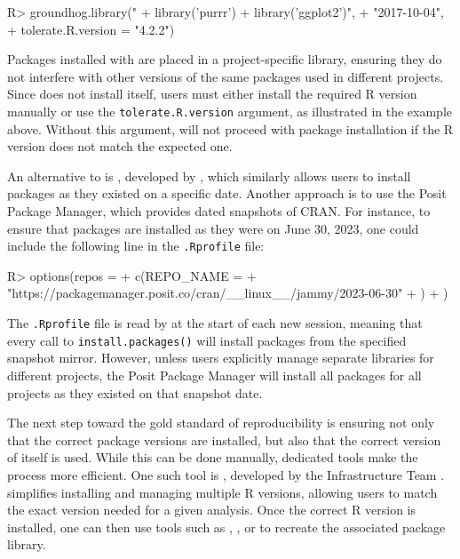 \documentclass[
  article]{jss}
\begin{document}
\begin{CodeInput}
R> groundhog.library("
+   library('purrr')
+   library('ggplot2')",
+   "2017-10-04",
+   tolerate.R.version = "4.2.2")
\end{CodeInput}

Packages installed with  are placed in a project-specific
library, ensuring they do not interfere with other versions of the same
packages used in different projects. Since  does not
install  itself, users must either install the required R
version manually or use the \texttt{tolerate.R.version} argument, as
illustrated in the example above. Without this argument, 
will not proceed with package installation if the R version does not
match the expected one.

An alternative to  is , developed by
\citet{chan2023}, which similarly allows users to install packages as
they existed on a specific date. Another approach is to use the Posit
Package Manager, which provides dated snapshots of CRAN. For instance,
to ensure that packages are installed as they were on June 30, 2023, one
could include the following line in the \texttt{.Rprofile} file:

\begin{CodeInput}
R> options(repos =
+    c(REPO_NAME =
+      "https://packagemanager.posit.co/cran/__linux__/jammy/2023-06-30"
+    )
+  )
\end{CodeInput}

The \texttt{.Rprofile} file is read by  at the start of each
new session, meaning that every call to \texttt{install.packages()} will
install packages from the specified snapshot mirror. However, unless
users explicitly manage separate libraries for different projects, the
Posit Package Manager will install all packages for all projects as they
existed on that snapshot date.

The next step toward the gold standard of reproducibility is ensuring
not only that the correct package versions are installed, but also that
the correct version of  itself is used. While this can be
done manually, dedicated tools make the process more efficient. One such
tool is , developed by the  Infrastructure Team
\citeyearpar{rlib2023}.  simplifies installing and managing
multiple R versions, allowing users to match the exact version needed
for a given analysis. Once the correct R version is installed, one can
then use tools such as , , or  to
recreate the associated package library.
\end{document}
